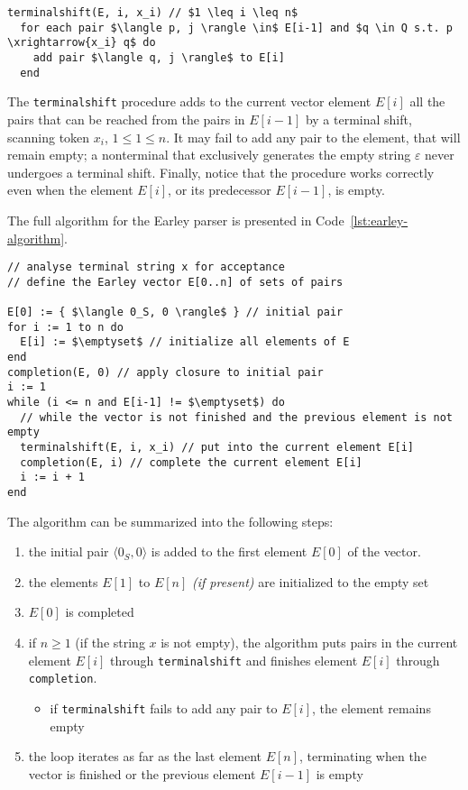 \documentclass[english]{article}
\begin{document}
\begin{lstlisting}[caption={\texttt{terminalshift} procedure}, label={lst:earley-terminalshift}]
terminalshift(E, i, x_i) // $1 \leq i \leq n$
  for each pair $\langle p, j \rangle \in$ E[i-1] and $q \in Q s.t. p \xrightarrow{x_i} q$ do
    add pair $\langle q, j \rangle$ to E[i]
  end
\end{lstlisting}

The \texttt{terminalshift} procedure adds to the current vector element \(E[i]\) all the pairs that can be reached from the pairs in \(E[i-1]\) by a terminal shift, scanning token \(x_i\), \(1 \leq 1 \leq n\).
It may fail to add any pair to the element, that will remain empty;
a nonterminal that exclusively generates the empty string \(\varepsilon\) never undergoes a terminal shift.
Finally, notice that the procedure works correctly even when the element \(E[i]\), or its predecessor \(E[i-1]\), is empty.

The full algorithm for the Earley parser is presented in Code~\ref{lst:earley-algorithm}.

\begin{lstlisting}[caption={Earley's Algorithm}, label={lst:earley-algorithm}]
// analyse terminal string x for acceptance
// define the Earley vector E[0..n] of sets of pairs

E[0] := { $\langle 0_S, 0 \rangle$ } // initial pair
for i := 1 to n do
  E[i] := $\emptyset$ // initialize all elements of E
end
completion(E, 0) // apply closure to initial pair
i := 1
while (i <= n and E[i-1] != $\emptyset$) do
  // while the vector is not finished and the previous element is not empty
  terminalshift(E, i, x_i) // put into the current element E[i]
  completion(E, i) // complete the current element E[i]
  i := i + 1
end
\end{lstlisting}

The algorithm can be summarized into the following steps:
\begin{enumerate}
  \item the initial pair \(\langle 0_S, 0 \rangle\) is added to the first element \(E[0]\) of the vector.
  \item the elements \(E[1]\) to \(E[n]\) \textit{(if present)} are initialized to the empty set
  \item \(E[0]\) is completed
  \item if \(n \geq 1\) (if the string \(x\) is not empty), the algorithm puts pairs in the current element \(E[i]\) through \texttt{terminalshift} and finishes element \(E[i]\) through \texttt{completion}.
        \begin{itemize}[label=\(\rightarrow\)]
          \item if \texttt{terminalshift} fails to add any pair to \(E[i]\), the element remains empty
        \end{itemize}
  \item the loop iterates as far as the last element \(E[n]\), terminating when the vector is finished or the previous element \(E[i-1]\) is empty
\end{enumerate}
\end{document}
